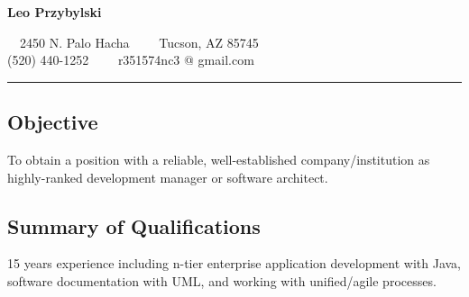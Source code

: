 \documentclass[10pt,letterpaper]{article}
\begin{document}
\begin{center}
  {\LARGE \textbf{Leo Przybylski}}

  \ \ 2450 N. Palo Hacha\ \ \textbullet
  \ \ Tucson, AZ 85745
  \\
  (520) 440-1252\ \ \textbullet
  \ \ r351574nc3 @ gmail.com
\end{center}

\hrule
\vspace{-0.4em}
\subsection*{Objective}
To obtain a position with a reliable, well-established
company/institution as highly-ranked development manager or software
architect.

\subsection*{Summary of Qualifications}
15 years experience including n-tier enterprise application development with Java, software 
documentation with UML, and working with unified/agile processes. 
\end{document}
